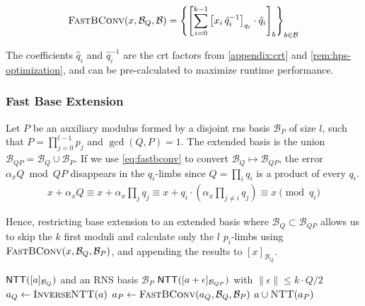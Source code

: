 \begin{equation}
    \label{eq:fastbconv}
    \Call{FastBConv}{x, \mathcal{B}_Q, \mathcal{B}} = \left\{\left[\sum_{i=0}^{k-1}\left[x_i\, \hat{q}_i^{-1}\right]_{q_i} \cdot \hat{q}_i\right]_b\right\}_{b\in \mathcal{B}}
\end{equation}

\begin{remark}
    The coefficients $\hat{q}_i$ and $\hat{q}_i^{-1}$ are the \gls{crt} factors from \autoref{appendix:crt} and \autoref{rem:hps-optimization}, and can be pre-calculated to maximize runtime performance.
\end{remark}

\subsubsection{Fast Base Extension}
Let $P$ be an auxiliary modulus formed by a disjoint \gls{rns} basis $\mathcal{B}_P$ of size $l$, such that $P = \prod_{j=0}^{l-1} p_j$ and $\gcd(Q, P) = 1$. The extended basis is the union $\mathcal{B}_{QP} = \mathcal{B}_Q \cup \mathcal{B}_P$. If we use \eqref{eq:fastbconv} to convert $\mathcal{B}_Q \mapsto \mathcal{B}_{QP}$, the error $\alpha_x Q \bmod{QP}$ disappears in the $q_i$-limbs since $Q = \prod_{i}q_i$ is a product of every $q_i$. %
\begin{gather*}
    x + \alpha_x Q \equiv x + \alpha_x \prod_{j}q_j \equiv x + q_i\cdot (\alpha_x \prod_{j\neq i}q_j) \equiv x \pmod{q_i}
\end{gather*}

Hence, restricting base extension to an extended basis where $\mathcal{B}_Q \subset \mathcal{B}_{QP}$ allows us to skip the $k$ first moduli and calculate only the $l$ $p_i$-limbs using $\Call{FastBConv}{x, \mathcal{B}_Q, \mathcal{B}_P}$, and appending the results to $[x]_{\mathcal{B}_Q}$.

\begin{algorithm}[ht!]
\caption{Fast Base Extension}
\label{alg:fast_base_extension}
\begin{algorithmic}[1]
    \Require $\mathsf{NTT}([a]_{\mathcal{B}_Q})$ and an RNS basis $\mathcal{B}_P$
    \Ensure $\mathsf{NTT}([a + \epsilon]_{\mathcal{B}_{QP}})$ with $\|\epsilon\| \leq k\cdot Q/2$
    \State $a_{Q} \gets \Call{InverseNTT}{a}$
    \State $a_{P} \gets \Call{FastBConv}{a_{Q}, \mathcal{B}_Q, \mathcal{B}_P}$
    \State\Return $a \cup \Call{NTT}{a_P}$
\end{algorithmic}
\end{algorithm}

